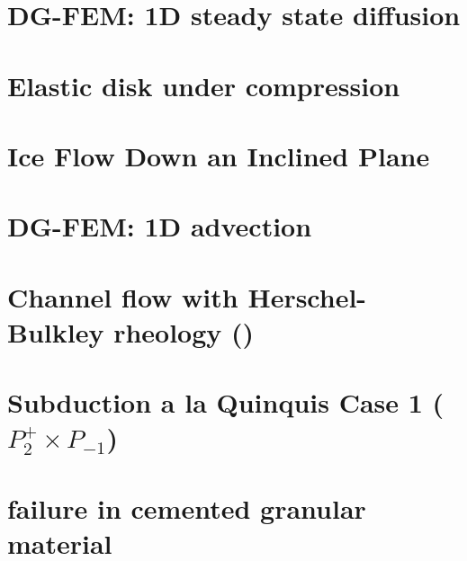 \documentclass[a4paper,11pt]{report}
\begin{document}
\chapter{DG-FEM: 1D steady state diffusion \label{f57}} %

\chapter{Elastic disk under compression \label{f58}} %

\chapter{Ice Flow Down an Inclined Plane \label{f59}} %

\chapter{DG-FEM: 1D advection \label{f60}} %

\chapter{Channel flow with Herschel-Bulkley rheology (\QtwoQone) \label{f61}} %

\chapter{Subduction a la Quinquis Case 1 ($P_2^+\times P_{-1}$) \label{f62}} %

\chapter{failure in cemented granular material \label{f63}} %
\end{document}
